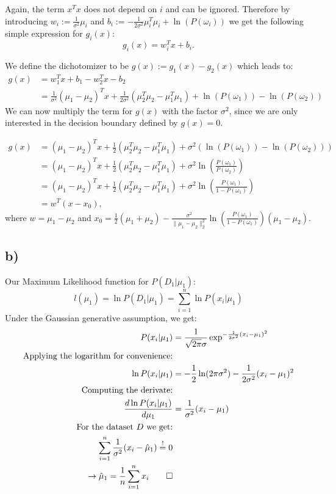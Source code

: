 \documentclass[paper=a4,fontsize=10pt,DIV11,BCOR10mm]{scrartcl}
\begin{document}
Again, the term $x^Tx$ does not depend on $i$ and can be ignored. Therefore by introducing $w_i:=\frac{1}{\sigma^2}\mu_i$ and $b_i:=-\frac{1}{2 \sigma^2}\mu_i^T\mu_i + \ln(P(\omega_i))$ we get the following simple expression for $g_i(x)$:
\begin{equation*}
g_i(x)=w_i^Tx+b_i\text{.}
\end{equation*}

We define the dichotomizer to be $g(x):=g_1(x)-g_2(x)$ which leads to:
\begin{align*}
g(x)&=w_1^Tx+b_1-w_2^Tx-b_2\\
&=\frac{1}{\sigma^2}(\mu_1-\mu_2)^Tx+\frac{1}{2 \sigma^2}(\mu_2^T\mu_2 -\mu_1^T\mu_1)+ \ln(P(\omega_1))- \ln(P(\omega_2))
\end{align*}
 We can now multiply the term for $g(x)$ with the factor $\sigma^2$, since we are only interested in the decision boundary defined by $g(x)=0$.

\begin{align*}
g(x)&=(\mu_1-\mu_2)^Tx + \frac{1}{2}(\mu_2^T\mu_2 -\mu_1^T\mu_1)+ \sigma^2(\ln(P(\omega_1))- \ln(P(\omega_2))) \\
&= (\mu_1-\mu_2)^Tx +\frac{1}{2}(\mu_2^T\mu_2 -\mu_1^T\mu_1)+ \sigma^2\ln(\frac{P(\omega_1)}{P(\omega_2)})\\
&=(\mu_1-\mu_2)^Tx +\frac{1}{2}(\mu_2^T\mu_2 -\mu_1^T\mu_1)+ \sigma^2\ln(\frac{P(\omega_1)}{1-P(\omega_1)})\\
&= w^T(x-x_0)\text{,}
\end{align*}
where $w=\mu_1-\mu_2$ and $x_0=\frac{1}{2}(\mu_1+\mu_2)-\frac{\sigma^2}{\lVert \mu_1 - \mu_2\rVert_2^2}\ln(\frac{P(\omega_1)}{1-P(\omega_1)})(\mu_1-\mu_2)$.


\subsection*{b)}
	Our Maximum Likelihood function for $P(D_1|\mu_1)$:
	\[
	l(\mu_1) = \ln P(D_1|\mu_1) = \sum_{i=1}^n \ln P(x_i|\mu_1)
	\]
	Under the Gaussian generative assumption, we get:
	\begin{align*}
		P(x_i|\mu_1) &= \frac{1}{\sqrt{2\pi}\sigma}\exp^{-\frac{1}{2\sigma^2}(x_i-\mu_1)^2}\\
	\text{Applying the logarithm for convenience:}&\\
		\ln P(x_i|\mu_1) &=-\frac{1}{2} \ln (2\pi \sigma^2) -\frac{1}{2\sigma^2}(x_i-\mu_1)^2\\
	\text{Computing the derivate:}&\\
		\frac{d \ln P(x_i|\mu_1)}{d \mu_1} &= \frac{1}{\sigma^2}(x_i- \mu_1)\\
	\text{For the dataset $D$ we get:}&\\
	\sum_{i=1}^n \frac{1}{\sigma^2}(x_i- \hat{\mu}_1) \stackrel{!}{=} 0\\
	\rightarrow \hat{\mu}_1=\frac{1}{n} \sum_{i=1}^n x_i \qed
	\end{align*}
\end{document}
